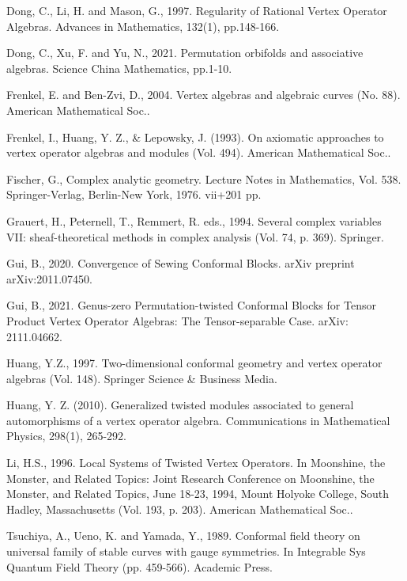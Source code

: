 \documentclass[12pt,a4paper,notitlepage]{article}
\theoremstyle{definition}
\theoremstyle{plain}
\numberwithin{equation}{section}
\begin{document}
\begin{thebibliography}{999999}
Dong, C., Li, H. and Mason, G., 1997. Regularity of Rational Vertex Operator Algebras. Advances in Mathematics, 132(1), pp.148-166.


Dong, C., Xu, F. and Yu, N., 2021. Permutation orbifolds and associative algebras. Science China Mathematics, pp.1-10.



Frenkel, E. and Ben-Zvi, D., 2004. Vertex algebras and algebraic curves (No. 88). American Mathematical Soc..


Frenkel, I., Huang, Y. Z., \& Lepowsky, J. (1993). On axiomatic approaches to vertex operator algebras and modules (Vol. 494). American Mathematical Soc..




Fischer, G., Complex analytic geometry. Lecture Notes in Mathematics, Vol. 538. Springer-Verlag, Berlin-New York, 1976. vii+201 pp.


Grauert, H., Peternell, T.,  Remmert, R. eds., 1994. Several complex variables VII: sheaf-theoretical methods in complex analysis (Vol. 74, p. 369). Springer.


Gui, B., 2020. Convergence of Sewing Conformal Blocks. arXiv preprint arXiv:2011.07450.


Gui, B., 2021. Genus-zero Permutation-twisted Conformal Blocks for Tensor Product Vertex Operator Algebras: The Tensor-separable Case. arXiv: 2111.04662.



Huang, Y.Z., 1997. Two-dimensional conformal geometry and vertex operator algebras (Vol. 148). Springer Science \& Business Media.

Huang, Y. Z. (2010). Generalized twisted modules associated to general automorphisms of a vertex operator algebra. Communications in Mathematical Physics, 298(1), 265-292.

Li, H.S., 1996. Local Systems of Twisted Vertex Operators. In Moonshine, the Monster, and Related Topics: Joint Research Conference on Moonshine, the Monster, and Related Topics, June 18-23, 1994, Mount Holyoke College, South Hadley, Massachusetts (Vol. 193, p. 203). American Mathematical Soc..

Tsuchiya, A., Ueno, K. and Yamada, Y., 1989. Conformal field theory on universal family of stable curves with gauge symmetries. In Integrable Sys Quantum Field Theory (pp. 459-566). Academic Press.


\end{thebibliography}
\end{document}
